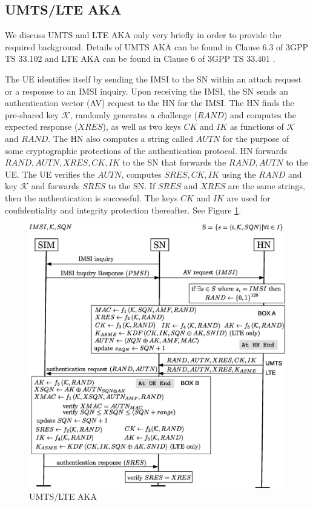 \documentclass{llncs} %
\begin{document}
\subsection{UMTS/LTE AKA}
We discuss UMTS and LTE AKA only very briefly in order to provide the required background. Details of UMTS AKA can be found in Clause 6.3 of 3GPP TS 33.102 \cite{TS33102} and LTE AKA can be found in Clause 6 of 3GPP TS 33.401 \cite{TS33401}. 

The UE identifies itself by sending the IMSI to the SN within an attach request or a response to an IMSI inquiry. Upon receiving the IMSI, the SN sends an authentication vector (AV) request to the HN for the IMSI. The HN finds the pre-shared key $\mathcal{K}$, randomly generates a challenge ($RAND$) and computes the expected response ($XRES$), as well as two keys $CK$ and $IK$ as functions of $\mathcal{K}$ and $RAND$. The HN also computes a string called $AUTN$ for the purpose of some cryptographic protections of the authentication protocol. HN forwards $RAND,AUTN,XRES, CK,IK$ to the SN that forwards the $RAND,AUTN$ to the UE. The UE verifies the $AUTN$, computes $SRES,CK,IK$ using the $RAND$ and key $\mathcal{K}$ and forwards $SRES$ to the SN. If $SRES$ and $XRES$ are the same strings, then the authentication is successful. The keys $CK$ and $IK$ are used for confidentiality and integrity protection thereafter. See Figure \ref{fig:UMTS_LTE_AKA}.

\begin{figure}[]
  \centering
    \includegraphics[scale=0.32, clip=true, trim=0cm 0cm 0cm 1cm]{UMTS_LTE_AKA.eps}
  \caption{UMTS/LTE AKA}
  \label{fig:UMTS_LTE_AKA}
\end{figure}
\end{document}
